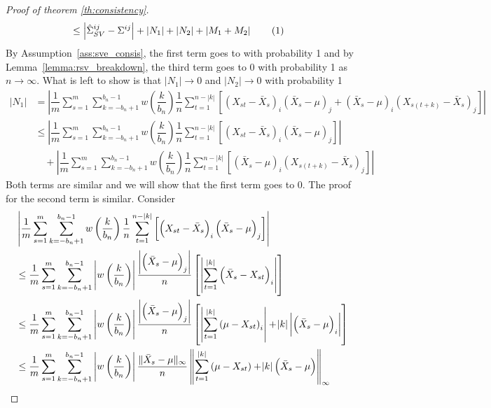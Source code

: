 \documentclass[11pt]{article}
\newcommand\numberthis{\addtocounter{equation}{1}\tag{\theequation}}
\theoremstyle{remark}
\begin{document}
\begin{proof}[Proof of theorem \ref{th:consistency}]
\begin{align*}
& \leq \left| \hat{\Sigma}_{SV}^{ij} - \Sigma^{ij} \right| +  \left| N_1 \right| +  \left|N_2 \right| + \left| M_1 + M_2 \right| \numberthis \label{eq:RSV_full_decomp}
\end{align*}
%
By Assumption~\ref{ass:sve_consis}, the first term goes to with probability 1 and by Lemma~\ref{lemma:rsv_breakdown}, the third term goes to 0 with probability 1 as $n \to \infty$. What is left to show is that $|N_1| \to 0$ and $|N_2| \to 0$ with probability 1
%
\begin{align*}
|N_1| & = \left|\dfrac{1}{m}\sum_{s=1}^{m}  \sum_{k=-b_n+1}^{b_n-1}  w\left(\dfrac{k}{b_n}\right)\dfrac{1}{n}  \sum_{t=1}^{n-|k|}  \left[ \left(X_{st} - \bar{X}_s \right)_i  \left(\bar{X}_s - \mu \right)_j + \left(\bar{X}_s - \mu \right)_i  \left(X_{s(t+k)} - \bar{X}_s \right)_j\right] \right|\\
& \leq \left| \dfrac{1}{m}\sum_{s=1}^{m}\sum_{k=-b_n+1}^{b_n-1}w\left(\dfrac{k}{b_n}\right)\dfrac{1}{n}\sum_{t=1}^{n-|k|}\left[ \left(X_{st} - \bar{X}_s \right)_i  \left(\bar{X}_s - \mu \right)_j \right] \right| \\ 
& \quad + \left| \dfrac{1}{m}\sum_{s=1}^{m}\sum_{k=-b_n+1}^{b_n-1}w\left(\dfrac{k}{b_n}\right)\dfrac{1}{n}\sum_{t=1}^{n-|k|}\left[ \left(\bar{X}_s - \mu \right)_i  \left(X_{s(t+k)} - \bar{X}_s \right)_j\right] \right|
\end{align*}
%
Both terms are similar and we will show that the first term goes to 0. The proof for the second term is similar. Consider
\begin{align*}
    & \left| \dfrac{1}{m}\sum_{s=1}^{m}\sum_{k=-b_n+1}^{b_n-1}w\left(\dfrac{k}{b_n}\right)\dfrac{1}{n}\sum_{t=1}^{n-|k|}\left[ \left(X_{st} - \bar{X}_s \right)_i  \left(\bar{X}_s - \mu \right)_j \right] \right| \\
    & \leq \dfrac{1}{m}\sum_{s=1}^{m}\sum_{k=-b_n+1}^{b_n-1}  \left|w\left(\dfrac{k}{b_n}\right)  \right|\dfrac{  \left| \left(\bar{X}_s - \mu \right)_j \right| }{n} \left[ \left|  \sum_{t=1}^{|k|} \left(\bar{X}_s - X_{st} \right)_i  \right| \right]\\
    & \leq \dfrac{1}{m}\sum_{s=1}^{m}\sum_{k=-b_n+1}^{b_n-1} \left| w\left(\dfrac{k}{b_n}\right) \right| \dfrac{ \left|  \left(\bar{X}_s - \mu \right)_j \right| }{n} \left[ \left|\sum_{t=1}^{|k|} \left(\mu - X_{st} \right)_i \right| + \abs{k} \left|\left(\bar{X}_s - \mu \right)_i \right|\right]\\
    & \leq \dfrac{1}{m}\sum_{s=1}^{m}\sum_{k=-b_n+1}^{b_n-1}  \left|w\left(\dfrac{k}{b_n}\right) \right|\dfrac{\|\bar{X}_s - \mu\|_{\infty}}{n} \left\|\sum_{t=1}^{|k|} \left(\mu - X_{st} \right) + \abs{k} \left(\bar{X}_s - \mu \right)\right\|_{\infty}\\

\end{align*}
\end{proof}
\end{document}
